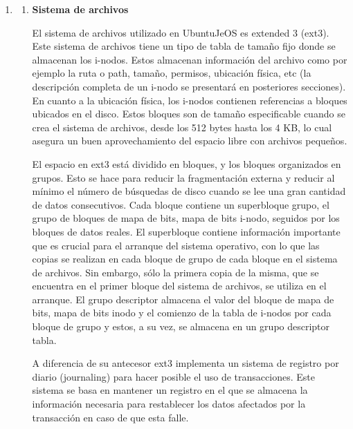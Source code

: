 \documentclass[a4paper,11pt] {article}
\begin{document}
\begin{enumerate}
		\item 
			\begin{enumerate}
				\item \textbf{Sistema de archivos} 

				El sistema de archivos utilizado en UbuntuJeOS es extended 3 (ext3). Este sistema de archivos tiene un tipo de tabla de tamaño fijo donde se almacenan los i-nodos. Estos almacenan información del archivo como por ejemplo la ruta o path, tamaño, permisos, ubicación física, etc (la descripción completa de un i-nodo se presentará en posteriores secciones). En cuanto a la ubicación física, los i-nodos contienen referencias a bloques ubicados en el disco. Estos bloques son de tamaño especificable cuando se crea el sistema de archivos, desde los 512 bytes hasta los 4 KB, lo cual asegura un buen aprovechamiento del espacio libre con archivos pequeños.
	
				El espacio en ext3 está dividido en bloques, y los bloques organizados en grupos. Esto se hace para reducir la fragmentación externa y reducir al mínimo el número de búsquedas de disco cuando se lee una gran cantidad de datos consecutivos.
				Cada bloque contiene un superbloque grupo, el grupo de bloques de mapa de bits, mapa de bits i-nodo, seguidos por los bloques de datos reales.
				El superbloque contiene información importante que es crucial para el arranque del sistema operativo, con lo que las copias se realizan en cada bloque de grupo de cada bloque en el sistema de archivos. Sin embargo, sólo la primera copia de la misma, que se encuentra en el primer bloque del sistema de archivos, se utiliza en el arranque.
				El grupo descriptor almacena el valor del bloque de mapa de bits, mapa de bits inodo y el comienzo de la tabla de i-nodos por cada bloque de grupo y estos, a su vez, se almacena en un grupo descriptor tabla.
		
				A diferencia de su antecesor ext3 implementa un sistema de registro por diario (journaling) para hacer posible el uso de transacciones. Este sistema se basa en mantener un registro en el que se almacena la información necesaria para restablecer los datos afectados por la transacción en caso de que esta falle.


\end{enumerate}
\end{enumerate}
\end{document}
